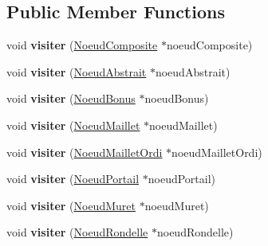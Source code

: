 \subsection*{Public Member Functions}
\begin{DoxyCompactItemize}
\item 
void {\bfseries visiter} (\hyperlink{class_noeud_composite}{Noeud\+Composite} $\ast$noeud\+Composite)\hypertarget{class_visiteur_supprimer_a85ae0bd318337c0fa829707c05ee60c0}{}\label{class_visiteur_supprimer_a85ae0bd318337c0fa829707c05ee60c0}

\item 
void {\bfseries visiter} (\hyperlink{class_noeud_abstrait}{Noeud\+Abstrait} $\ast$noeud\+Abstrait)\hypertarget{class_visiteur_supprimer_a50fdba5e38d3b7e88b68f8a94be68587}{}\label{class_visiteur_supprimer_a50fdba5e38d3b7e88b68f8a94be68587}

\item 
void {\bfseries visiter} (\hyperlink{class_noeud_bonus}{Noeud\+Bonus} $\ast$noeud\+Bonus)\hypertarget{class_visiteur_supprimer_a60f5b8f519a1bea90851f8eacad62508}{}\label{class_visiteur_supprimer_a60f5b8f519a1bea90851f8eacad62508}

\item 
void {\bfseries visiter} (\hyperlink{class_noeud_maillet}{Noeud\+Maillet} $\ast$noeud\+Maillet)\hypertarget{class_visiteur_supprimer_a1520b50e84a4cdb31963bd2c995ec432}{}\label{class_visiteur_supprimer_a1520b50e84a4cdb31963bd2c995ec432}

\item 
void {\bfseries visiter} (\hyperlink{class_noeud_maillet_ordi}{Noeud\+Maillet\+Ordi} $\ast$noeud\+Maillet\+Ordi)\hypertarget{class_visiteur_supprimer_adfceffd0d8ef2abd5452454fe2fe1b93}{}\label{class_visiteur_supprimer_adfceffd0d8ef2abd5452454fe2fe1b93}

\item 
void {\bfseries visiter} (\hyperlink{class_noeud_portail}{Noeud\+Portail} $\ast$noeud\+Portail)\hypertarget{class_visiteur_supprimer_ab042d110750498846595ad973f59cd63}{}\label{class_visiteur_supprimer_ab042d110750498846595ad973f59cd63}

\item 
void {\bfseries visiter} (\hyperlink{class_noeud_muret}{Noeud\+Muret} $\ast$noeud\+Muret)\hypertarget{class_visiteur_supprimer_a7096bb2f89c821da0c3d2ee47da1afa1}{}\label{class_visiteur_supprimer_a7096bb2f89c821da0c3d2ee47da1afa1}

\item 
void {\bfseries visiter} (\hyperlink{class_noeud_rondelle}{Noeud\+Rondelle} $\ast$noeud\+Rondelle)\hypertarget{class_visiteur_supprimer_af2538285429bf2ded72d1a1717417d6f}{}\label{class_visiteur_supprimer_af2538285429bf2ded72d1a1717417d6f}


\end{DoxyCompactItemize}
